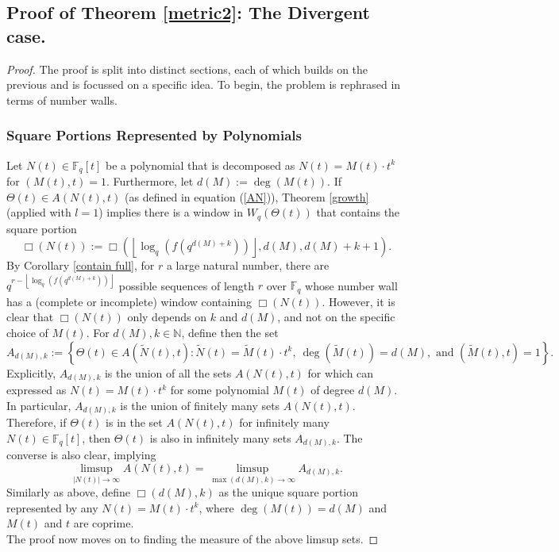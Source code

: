 \documentclass{article}
\theoremstyle{definition}
\newcommand{\N}{\mathbb{N}}
\newcommand{\F}{\mathbb{F}}
\numberwithin{equation}{subsection}
\begin{document}
\subsection{Proof of Theorem \ref{metric2}: The Divergent case. }  

\begin{proof}The proof is split into distinct sections, each of which builds on the previous and is focussed on a specific idea. To begin, the problem is rephrased in terms of number walls.

\subsubsection*{Square Portions Represented by Polynomials}

\noindent Let $N(t)\in\F_q[t]$ be a polynomial that is decomposed as $N(t)=M(t)\cdot t^k$ for $(M(t),t)=1$. Furthermore, let $d(M):= \deg(M(t))$. If $\Theta(t)\in A(N(t),t)$ (as defined in equation (\ref{AN})), Theorem \ref{growth} (applied with $l=1$) implies there is a window in $W_q(\Theta(t))$ that contains the square portion \[\Box(N(t)):=\Box\left(\left\lfloor\log_q(f(q^{d(M)+k}))\right\rfloor,d(M),d(M)+k+1\right).\] By Corollary \ref{contain full}, for $r$ a large natural number, there are $q^{r-\left\lfloor\log_q(f(q^{d(M)+k}))\right\rfloor}$ possible sequences of length $r$ over $\F_q$ whose number wall has a (complete or incomplete) window containing $\Box(N(t))$. However, it is clear that $\Box(N(t))$ only depends on $k$ and $d(M)$, and not on the specific choice of $M(t)$. For $d(M),k\in\N$, define then the set \[A_{d(M),k}:=\left\{\Theta(t)\in A(\widetilde N(t),t): \widetilde N(t)=\widetilde M(t)\cdot t^k, ~\deg(\widetilde M(t))=d(M), \text{ and } (\widetilde M(t),t)=1\right\}.\]
Explicitly, $A_{d(M),k}$ is the union of all the sets $A(N(t),t)$ for which can expressed as $N(t)=M(t)\cdot t^k$ for some polynomial $M(t)$ of degree $d(M)$. In particular, $A_{d(M),k}$ is the union of finitely many sets $A({N(t)},t)$. Therefore, if $\Theta(t)$ is in the set $A({N(t)},t)$ for infinitely many $N(t)\in\F_q[t]$, then $\Theta(t)$ is also in infinitely many sets $A_{d(M),k}$. The converse is also clear, implying \[\limsup_{|N(t)|\to\infty}A({N(t)},t)=\limsup_{\max(d(M),k)\to\infty}A_{d(M),k}.\]
Similarly as above, define $\Box(d(M),k)$ as the unique square portion represented by any $N(t)=M(t)\cdot t^k$, where $\deg(M(t))=d(M)$ and $M(t)$ and $t$ are coprime. \\

\noindent The proof now moves on to finding the measure of the above limsup sets.


\end{proof}
\end{document}
